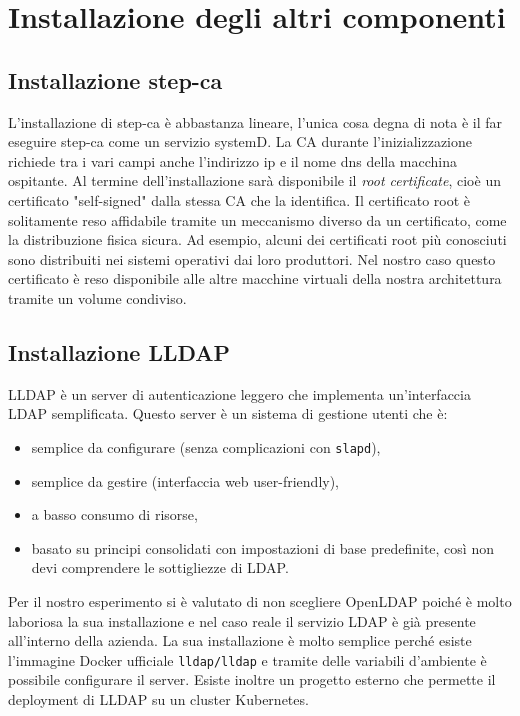 \documentclass[12pt]{report}
\begin{document}
\chapter{Installazione degli altri componenti}
\section{Installazione step-ca}
L'installazione di step-ca è abbastanza lineare, l'unica cosa degna di nota è il far eseguire step-ca come un servizio systemD. La CA durante l'inizializzazione richiede tra i vari campi anche l'indirizzo ip e il nome dns della macchina ospitante. Al termine dell'installazione sarà disponibile il \textit{root certificate}, cioè un certificato "self-signed" dalla stessa CA che la identifica. Il certificato root è solitamente reso affidabile tramite un meccanismo diverso da un certificato, come la distribuzione fisica sicura. Ad esempio, alcuni dei certificati root più conosciuti sono distribuiti nei sistemi operativi dai loro produttori.
Nel nostro caso questo certificato è reso disponibile alle altre macchine virtuali della nostra architettura tramite un volume condiviso.

\section{Installazione LLDAP}
LLDAP è un server di autenticazione leggero che implementa un'interfaccia LDAP semplificata. Questo server è un sistema di gestione utenti che è:
\begin{itemize}
    \item semplice da configurare (senza complicazioni con \texttt{slapd}),
    \item semplice da gestire (interfaccia web user-friendly),
    \item a basso consumo di risorse,
    \item basato su principi consolidati con impostazioni di base predefinite, così non devi comprendere le sottigliezze di LDAP.
\end{itemize}
Per il nostro esperimento si è valutato di non scegliere OpenLDAP poiché è molto laboriosa la sua installazione e nel caso reale il servizio LDAP è già presente all'interno della azienda.
La sua installazione è molto semplice perché esiste l'immagine Docker ufficiale \texttt{lldap/lldap} e tramite delle variabili d'ambiente è possibile configurare il server.
Esiste inoltre un progetto esterno che permette il deployment di LLDAP su un cluster Kubernetes. 
\end{document}
